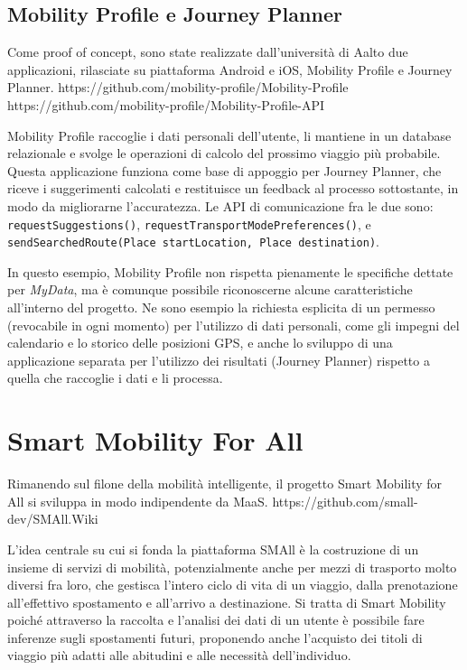 \subsection{Mobility Profile e Journey Planner}
Come proof of concept, sono state realizzate dall’università di Aalto due applicazioni, rilasciate su piattaforma Android e iOS, Mobility Profile e Journey Planner. https://github.com/mobility-profile/Mobility-Profile https://github.com/mobility-profile/Mobility-Profile-API

Mobility Profile raccoglie i dati personali dell’utente, li mantiene in un database relazionale e svolge le operazioni di calcolo del prossimo viaggio pi\`u probabile. Questa applicazione funziona come base di appoggio per Journey Planner, che riceve i suggerimenti calcolati e restituisce un feedback al processo sottostante, in modo da migliorarne l’accuratezza. Le API di comunicazione fra le due sono:
\texttt{requestSuggestions()}, \texttt{requestTransportModePreferences()}, e \texttt{sendSearchedRoute(Place startLocation, Place destination)}.

In questo esempio, Mobility Profile non rispetta pienamente le specifiche dettate per \textit{MyData}, ma \`e comunque possibile riconoscerne alcune caratteristiche all’interno del progetto. Ne sono esempio la richiesta esplicita di un permesso (revocabile in ogni momento) per l’utilizzo di dati personali, come gli impegni del calendario e lo storico delle posizioni GPS, e anche lo sviluppo di una applicazione separata per l’utilizzo dei risultati (Journey Planner) rispetto a quella che raccoglie i dati e li processa.

\section{Smart Mobility For All}
Rimanendo sul filone della mobilità intelligente, il progetto Smart Mobility for All si sviluppa in modo indipendente da MaaS. https://github.com/small-dev/SMAll.Wiki

L’idea centrale su cui si fonda la piattaforma SMAll \`e la costruzione di un insieme di servizi di mobilità, potenzialmente anche per mezzi di trasporto molto diversi fra loro, che gestisca l’intero ciclo di vita di un viaggio, dalla prenotazione all’effettivo spostamento e all’arrivo a destinazione. Si tratta di Smart Mobility poich\'e attraverso la raccolta e l’analisi dei dati di un utente \`e possibile fare inferenze sugli spostamenti futuri, proponendo anche l’acquisto dei titoli di viaggio pi\`u adatti alle abitudini e alle necessità dell’individuo.

